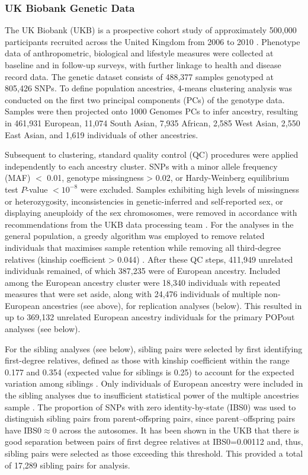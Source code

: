 \documentclass[12pt]{zHenriquesLab-StyleBioRxiv}
\begin{document}
\subsubsection*{UK Biobank Genetic Data} 
The UK Biobank (UKB) is a prospective cohort study of approximately
500,000 participants recruited across the United Kingdom from 2006 to
2010 \cite{ukb}. Phenotype data of anthropometric, biological and
lifestyle measures were collected at baseline and in follow-up surveys, with
further linkage to health and disease record data. The genetic dataset
consists of 488,377 samples genotyped at 805,426 SNPs.
To define population ancestries, 4-means clustering analysis was
conducted on the first two principal components (PCs) of the genotype
data. Samples were then projected onto 1000 Genomes PCs to infer
ancestry, resulting in 461,931 European, 11,074 South Asian, 7,935
African, 2,585 West Asian, 2,550 East Asian, and 1,619 individuals 
of other ancestries.

Subsequent to clustering, standard quality control (QC) procedures
were applied independently to each ancestry cluster. SNPs with a minor
allele frequency (MAF) $<$ 0.01, genotype missingness > 0.02, or
Hardy-Weinberg equilibrium test $P$-value $< 10^{-8}$ were
excluded. Samples exhibiting high levels of missingness or
heterozygosity, inconsistencies in genetic-inferred and self-reported
sex, or displaying aneuploidy of the sex chromosomes, were removed in
accordance with recommendations from the UKB data processing team
\cite{ukb_qc}.  For the analyses in the general population, a greedy
algorithm was employed to remove related individuals that maximises
sample retention while removing all third-degree relatives (kinship
coefficient > 0.044) \cite{erase}.  After these QC steps, 411,949 unrelated    %
individuals remained, of which 387,235 were of European ancestry. Included 
among the European ancestry cluster were 18,340 individuals with repeated 
measures that were set aside, along with 24,476 individuals of multiple 
non-European ancestries (see above), for replication analyses (below). This resulted in up to 369,132 
unrelated European ancestry individuals for the primary POPout analyses (see below). 

For the sibling analyses (see below), sibling pairs were selected by first
identifying first-degree relatives, defined as those with kinship
coefficient within the range 0.177 and 0.354 (expected value for
siblings is 0.25) to account for the expected variation among siblings \cite{sib1}. 
Only individuals of European ancestry were included in the sibling analyses due to 
insufficient statistical power of the multiple ancestries sample \cite{Souaiaia2024}. 
The proportion of SNPs with zero identity-by-state (IBS0) was used to distinguish 
sibling pairs from parent-offspring pairs, since parent–offspring pairs have
IBS0$\approx$0 across the autosomes. It has been shown in the UKB that
there is good separation between pairs of first degree relatives at
IBS0=0.00112 \cite{sib1} and, thus, sibling pairs were selected as
those exceeding this threshold. This provided a total of 17,289 sibling pairs 
for analysis.
\end{document}
